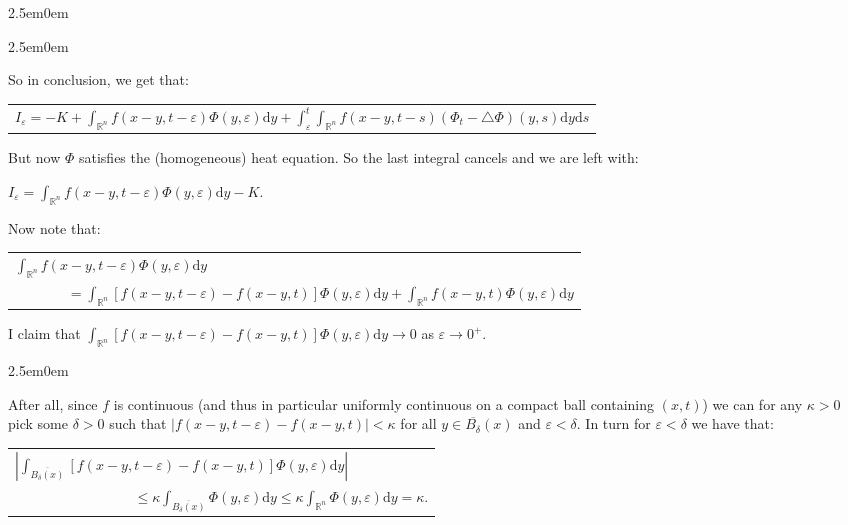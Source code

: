\documentclass{book}
\newcommand{\pracTwo}{
   \color{Orange}%
   \fontsize{12}{14}\selectfont%
}
\newenvironment{myIndent}{%
   \begin{adjustwidth}{2.5em}{0em}%
}{%
   \end{adjustwidth}%
}
\newcommand{\df}{\mathrm{d}}
\newcommand{\retTwo}{\hfill\bigbreak}
\begin{document}
\begin{myIndent}
\begin{myIndent}
		So in conclusion, we get that:

		{\centering\begin{tabular}{l}
			$I_\varepsilon = -K + \int_{\mathbb{R}^n}f(x - y, t - \varepsilon)\Phi(y, \varepsilon)\df y + \int_\varepsilon^t \int_{\mathbb{R}^n}f(x - y, t - s)(\Phi_t - \triangle \Phi)(y, s)\df y \df s$
		\end{tabular}\retTwo\par}

		But now $\Phi$ satisfies the (homogeneous) heat equation. So the last integral cancels and we are left with:

		{\centering$I_\varepsilon = \int_{\mathbb{R}^n} f(x - y, t - \varepsilon)\Phi(y, \varepsilon)\df y - K$.\retTwo\par}

		Now note that:
		
		{\centering\begin{tabular}{l}
			$\int_{\mathbb{R}^n} f(x - y, t - \varepsilon)\Phi(y, \varepsilon)\df y$\\ [4pt]
			$\phantom{aaaaaaa} = \int_{\mathbb{R}^n} \left[f(x - y, t - \varepsilon) - f(x - y, t)\right]\Phi(y, \varepsilon)\df y + \int_{\mathbb{R}^n} f(x - y, t)\Phi(y, \varepsilon)\df y$
		\end{tabular}\retTwo\par}

		I claim that $\int_{\mathbb{R}^n} \left[f(x - y, t - \varepsilon) - f(x - y, t)\right]\Phi(y, \varepsilon)\df y \to 0$ as $\varepsilon \to 0^+$.\\ [-8pt]
		\begin{myIndent}\pracTwo
			After all, since $f$ is continuous (and thus in particular uniformly continuous on a compact ball containing $(x, t)$) we can for any $\kappa > 0$ pick some $\delta > 0$ such that $|f(x - y, t - \varepsilon) - f(x - y, t)| < \kappa$ for all $y \in \overline{B_\delta}(x)$ and $\varepsilon < \delta$. In turn for $\varepsilon < \delta$ we have that:

			{\centering\begin{tabular}{l}
				$\left|\int_{\overline{B_\delta(x)}} \left[f(x - y, t - \varepsilon) - f(x - y, t)\right]\Phi(y, \varepsilon)\df y\right|$\\ [8pt]
				$\phantom{aaaaaaaaaaaaaaaa} \leq \kappa\int_{\overline{B_\delta(x)}}\Phi(y, \varepsilon)\df y \leq \kappa \int_{\mathbb{R}^n}\Phi(y, \varepsilon) \df y = \kappa$.
			\end{tabular}\retTwo\par}
			

\end{myIndent}
\end{myIndent}
\end{myIndent}
\end{document}
